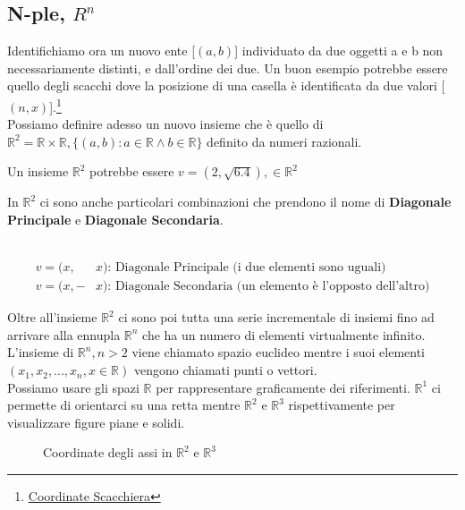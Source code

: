 \subsection{N-ple, $R^n$}

Identifichiamo ora un nuovo ente [$(a,b)$] individuato da due oggetti a e b non necessariamente distinti, e dall'ordine dei due. Un buon esempio potrebbe essere quello degli scacchi dove la posizione di una casella è identificata da due valori [$(n,x)$].\footnote{\href{https://upload.wikimedia.org/wikipedia/commons/thumb/b/b6/SCD_algebraic_notation.svg/1200px-SCD_algebraic_notation.svg.png}{Coordinate Scacchiera}}
\leavevmode\\
Possiamo definire adesso un nuovo insieme che è quello di $\mathbb{R}^{2}=\mathbb{R}\times \mathbb{R}, \{(a,b):a\in \mathbb{R} \wedge b\in \mathbb{R}\}$ definito da numeri razionali.
\begin{es}
	Un insieme $\mathbb{R}^{2}$ potrebbe essere $v=(2,\sqrt{6.4}), \in \mathbb{R}^{2}$
\end{es}

\begin{nota}
	In $\mathbb{R}^{2}$ ci sono anche particolari combinazioni che prendono il nome di \textbf{Diagonale Principale} e \textbf{Diagonale Secondaria}.
	\begin{es}
		\phantom{}\\
		\begin{align*}
			v=(x,&x) \text{: Diagonale Principale (i due elementi sono uguali)}\\
			v=(x,-&x) \text{: Diagonale Secondaria (un elemento è l'opposto dell'altro)}
		\end{align*}
	\end{es}
\end{nota}

Oltre all'insieme $\mathbb{R}^{2}$ ci sono poi tutta una serie incrementale di insiemi fino ad arrivare alla ennupla $\mathbb{R}^{n}$ che ha un numero di elementi virtualmente infinito. L'insieme di $\mathbb{R}^{n}, n>2$ viene chiamato spazio euclideo mentre i suoi elementi $(x_{1},x_{2},...,x_{n}, x\in \mathbb{R})$ vengono chiamati punti o vettori.\\
Possiamo usare gli spazi $\mathbb{R}$ per rappresentare graficamente dei riferimenti. $\mathbb{R}^{1}$ ci permette di orientarci su una retta mentre $\mathbb{R}^{2}$ e $\mathbb{R}^{3}$ rispettivamente per visualizzare figure piane e solidi.

\begin{figure}[H]
	\centering
	\caption[Caption]{Coordinate degli assi in $\mathbb{R}^{2}$ e $\mathbb{R}^{3}$}
	\label{fig:pianocartesiano}
\end{figure}

